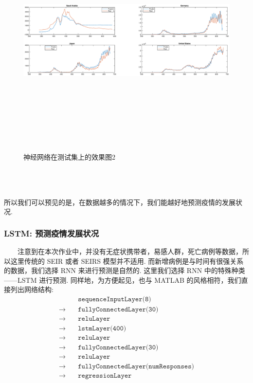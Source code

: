 \documentclass[a4paper, titlepage]{article}
\begin{document}
    \begin{minipage}{\textwidth}
        \begin{figure}[H]
            \centering
	        \includegraphics[height=12cm, width=14cm]{./Chap4/Pred3.eps}
            \vspace{-4cm}
            \caption{神经网络在测试集上的效果图2}
        \end{figure}
    \end{minipage}\\\quad\\
    \quad\\
	所以我们可以预见的是，在数据越多的情况下，我们能越好地预测疫情的发展状况.

	\subsubsection{LSTM: 预测疫情发展状况}
    　　注意到在本次作业中，并没有无症状携带者，易感人群，死亡病例等数据，所以这里传统的 SEIR 或者 SEIRS 模型并不适用. 而新增病例是与时间有很强关系的数据，我们选择 RNN 来进行预测是自然的. 这里我们选择 RNN 中的特殊种类——LSTM 进行预测. 同样地，为方便起见，也与 MATLAB 的风格相符，我们直接列出网络结构:
	\begin{align*}
		&\texttt{sequenceInputLayer(8)} \\
        \rightarrow\quad&\texttt{fullyConnectedLayer(30)}\\
    	\rightarrow\quad&\texttt{reluLayer}\\
    	\rightarrow\quad&\texttt{lstmLayer(400)}\\
    	\rightarrow\quad&\texttt{reluLayer}\\
    	\rightarrow\quad&\texttt{fullyConnectedLayer(30)}\\
    	\rightarrow\quad&\texttt{reluLayer}\\
    	\rightarrow\quad&\texttt{fullyConnectedLayer(numResponses)}\\
    	\rightarrow\quad&\texttt{regressionLayer}
	\end{align*}
\end{document}
